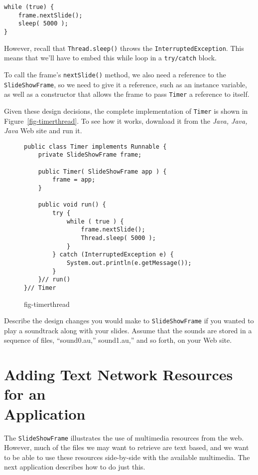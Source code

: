 {\begin{jjjlisting}
\begin{lstlisting}
while (true) {
    frame.nextSlide();
    sleep( 5000 );
}
\end{lstlisting}
\end{jjjlisting}

\noindent However, recall that {\tt Thread.sleep()} throws the
{\tt Interrupted\-Excep\-tion}. This means that we'll have to
embed this while loop in a {\tt try/catch} block.

To call the frame's {\tt nextSlide()} method, we also need a
reference to the {\tt SlideShowFrame}, so we need to give it a
reference, such as an instance variable, as well as a constructor that
allows the frame to pass {\tt Timer} a reference to itself.

Given these design decisions, the complete implementation of
{\tt Timer} is shown in Figure~\ref{fig-timerthread}. To see how it works,
download it from the {\it Java, Java, Java} Web site and run it.

\begin{figure}[h]
\jjjprogstart
\begin{jjjlisting}
\begin{lstlisting}
public class Timer implements Runnable {
    private SlideShowFrame frame;

    public Timer( SlideShowFrame app ) {
        frame = app;
    }

    public void run() {
        try {
            while ( true ) {
                frame.nextSlide();
                Thread.sleep( 5000 );
            }
        } catch (InterruptedException e) {
            System.out.println(e.getMessage());
        }
    }// run()
}// Timer
\end{lstlisting}
\end{jjjlisting}
{fig-timerthread}
\end{figure}

\label{self-study-exercise}
\begin{SSTUDY}

\item  Describe the design changes you would make to 
{\tt SlideShow\-Frame} if you wanted to play a soundtrack along with
your slides.  Assume that the sounds are stored in a sequence of
files, ``sound0.au,'' sound1.au,'' and so forth, on your Web site.
\end{SSTUDY}

\section{Adding Text Network Resources for an \\Application}
\label{adding-text-network-resourcesforan-application}
\noindent The {\tt SlideShowFrame} illustrates the use of multimedia
resources from the web. However, much of the files we may want to
retrieve are text based, and we want to be able to use these resources
side-by-side with the available multimedia. The next application
describes how to do just this.

}
